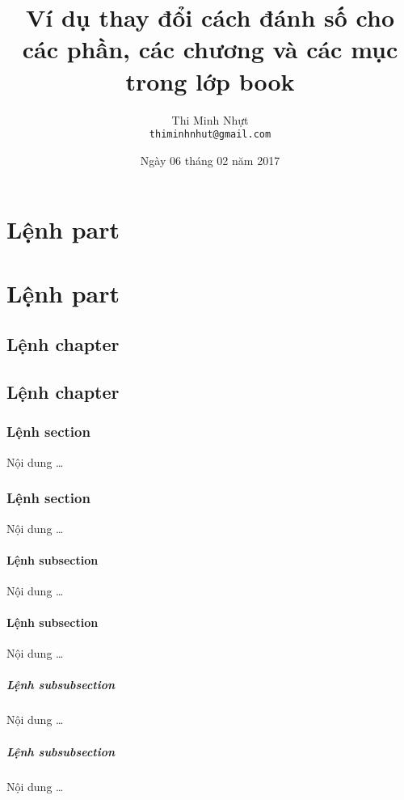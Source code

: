 \documentclass[12pt,a4paper]{report}
\title{\bfseries \huge Ví dụ thay đổi cách đánh số cho các phần, các chương và các mục trong lớp book}
\author{\Large Thi Minh Nhựt \bigskip \\  \Large \texttt{thiminhnhut@gmail.com}}
\date{\Large Ngày 06 tháng 02 năm 2017}
\begin{document}
\maketitle
\tableofcontents
\thispagestyle{empty}
\newpage

\part{Lệnh part}
\part{Lệnh part}

\chapter{Lệnh chapter}
\chapter{Lệnh chapter}

\section{Lệnh section}
Nội dung \ldots
\section{Lệnh section}
Nội dung \ldots

\subsection{Lệnh subsection}
Nội dung \ldots
\subsection{Lệnh subsection}
Nội dung \ldots

\subsubsection{Lệnh subsubsection}
Nội dung \ldots
\subsubsection{Lệnh subsubsection}
Nội dung \ldots
\end{document}
